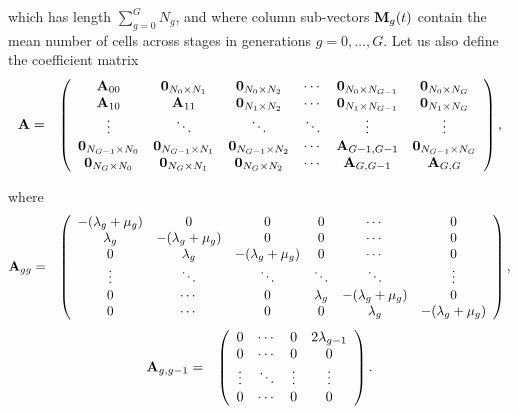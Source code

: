 \documentclass[10pt]{article}
\numberwithin{equation}{section}
\begin{document}
which has length $\sum_{g=0}^G N_g$, and where column sub-vectors ${\bf M}_g(t)$ contain the mean number of cells across stages in generations $g=0,\ldots,G$. Let us also define the coefficient matrix
\begin{eqnarray*}
{\bf A} &=& \left(\begin{array}{cccccc}
{\bf A}_{00} & {\bf 0}_{N_0\times N_1} & {\bf 0}_{N_0\times N_2} & \cdots & {\bf 0}_{N_0\times N_{G-1}} & {\bf 0}_{N_0\times N_{G}}\\
{\bf A}_{10} & {\bf A}_{11} & {\bf 0}_{N_1\times N_2} & \cdots & {\bf 0}_{N_1\times N_{G-1}} & {\bf 0}_{N_1\times N_{G}}\\
\vdots & \ddots & \ddots & \ddots & \vdots & \vdots\\
{\bf 0}_{N_{G-1}\times N_0} & {\bf 0}_{N_{G-1}\times N_1} & {\bf 0}_{N_{G-1}\times N_2} & \cdots & {\bf A}_{G-1,G-1} & {\bf 0}_{N_{G-1}\times N_{G}}\\
{\bf 0}_{N_{G}\times N_0} & {\bf 0}_{N_{G}\times N_1} & {\bf 0}_{N_{G}\times N_2} & \cdots & {\bf A}_{G,G-1} & {\bf A}_{G,G}\\
\end{array}\right),
\end{eqnarray*}
\par\noindent where\\
\begin{eqnarray*}
{\bf A}_{gg} &=& \left(\begin{array}{cccccc}
-(\lambda_g+\mu_g) & 0 & 0 & 0 & \cdots & 0 \\
 \lambda_g & -(\lambda_g+\mu_g) & 0 & 0 & \cdots & 0 \\
  0 & \lambda_g & -(\lambda_g+\mu_g) & 0 & \cdots & 0 \\
  \vdots  & \ddots  & \ddots & \ddots & \ddots & \vdots \\
  0  & \cdots & 0 & \lambda_g & -(\lambda_g+\mu_g) & 0\\
  0  & \cdots & 0 & 0 & \lambda_g & -(\lambda_g+\mu_g) \\
\end{array}\right),
\end{eqnarray*}
\begin{eqnarray*}
{\bf A}_{g,g-1} &=& \left(\begin{array}{cccc}
 0 & \cdots & 0 & 2 \lambda_{g-1}\\
 0 & \cdots & 0 & 0\\
 \vdots & \ddots & \vdots & \vdots \\
 0 & \cdots & 0 &  0 \\
\end{array}\right).
\end{eqnarray*}
\end{document}
